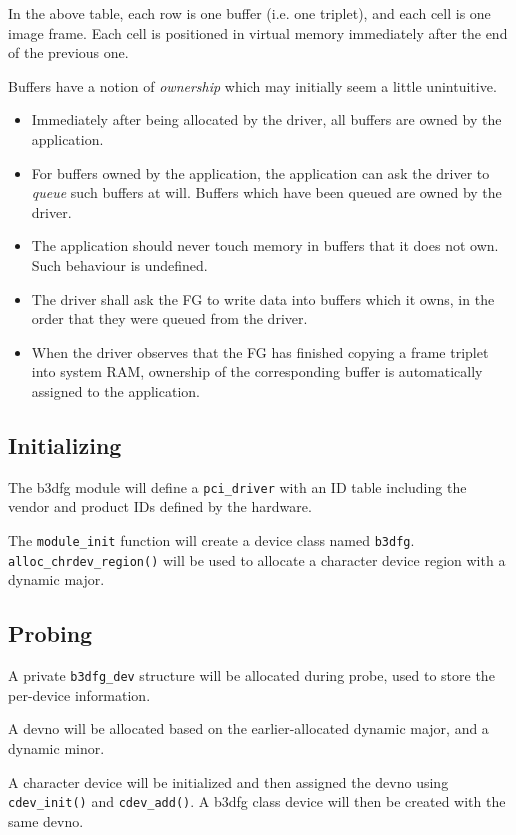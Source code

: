 \documentclass[12pt]{article}
\begin{document}
In the above table, each row is one buffer (i.e. one triplet), and each cell is one image frame. Each cell is positioned in virtual memory immediately after the end of the previous one.

Buffers have a notion of \textit{ownership} which may initially seem a little unintuitive.
\begin{itemize}
\item Immediately after being allocated by the driver, all buffers are owned by the application.
\item For buffers owned by the application, the application can ask the driver to \textit{queue} such buffers at will. Buffers which have been queued are owned by the driver.
\item The application should never touch memory in buffers that it does not own. Such behaviour is undefined.
\item The driver shall ask the FG to write data into buffers which it owns, in the order that they were queued from the driver.
\item When the driver observes that the FG has finished copying a frame triplet into system RAM, ownership of the corresponding buffer is automatically assigned to the application.
\end{itemize}

\subsection{Initializing}

The b3dfg module will define a \texttt{pci\_driver} with an ID table including the vendor and product IDs defined by the hardware.

The \texttt{module\_init} function will create a device class named \texttt{b3dfg}. \texttt{alloc\_chrdev\_region()} will be used to allocate a character device region with a dynamic major.

\subsection{Probing}

A private \texttt{b3dfg\_dev} structure will be allocated during probe, used to store the per-device information.

A devno will be allocated based on the earlier-allocated dynamic major, and a dynamic minor.

A character device will be initialized and then assigned the devno using \texttt{cdev\_init()} and \texttt{cdev\_add()}. A b3dfg class device will then be created with the same devno.
\end{document}
